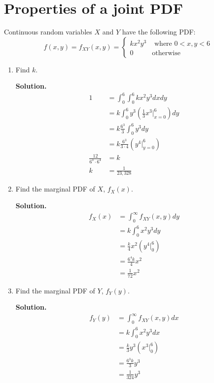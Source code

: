 \documentclass[12pt]{article}
\begin{document}
\section{Properties of a joint PDF}
Continuous random variables $X$ and $Y$ have the following PDF:
\[ f(x,y) = f_{XY}(x,y) = \begin{cases}
    kx^2y^3 & \text{ where }0<x,y<6
    \\ 0 & \text{otherwise}
\end{cases}\]
\begin{enumerate}
    \item Find $k$.

    \textbf{Solution.}
    \begin{align*}
        1 &= \int_0^6 \int_0^6 kx^2y^3dxdy
        \\ &= k \int_0^6 y^3 \left( \frac{1}{3}x^3\bigg|_{x=0}^6\right) dy
        \\ &= k \frac{6^3}{3} \int_0^6 y^3 dy 
        \\ &= k\frac{6^3}{3\cdot 4} \left( y^4 \bigg|_{y=0}^6 \right)
        \\ \frac{12}{6^3 \cdot 6^4} &= k
        \\ k&= \frac{1}{23,328}
    \end{align*}

    \item Find the marginal PDF of $X$, $f_X(x)$.

    \textbf{Solution.}
    \begin{align*}
        f_X(x) &= \int_0^\infty f_{XY}(x,y) dy
        \\ &= k\int_0^6 x^2y^3 dy
        \\ &= \frac{k}{4} x^2 \left( y^4 \bigg|_0^6\right) 
        \\ &= \frac{6^4 k}{4}x^2
        \\ &= \frac{1}{72}x^2
    \end{align*}

    \item Find the marginal PDF of $Y$, $f_Y(y)$.

    \textbf{Solution.}
    \begin{align*}
         f_Y(y) &= \int_0^\infty f_{XY}(x,y) dx
        \\ &= k\int_0^6 x^2 y^3 dx
        \\ &= \frac{k}{3} y^3 \left( x^3 \bigg|_0^6\right) 
        \\ &= \frac{6^3 k}{3}y^3
        \\ &= \frac{1}{324}y^3
    \end{align*}


\end{enumerate}
\end{document}
